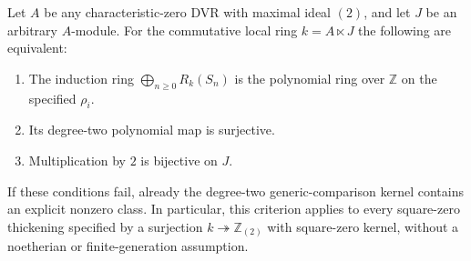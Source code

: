 \begin{theorem}
\label{C:squarezero_intrinsic_criterion}
Let $A$ be any characteristic-zero DVR with maximal ideal $(2)$,
and let $J$ be an arbitrary $A$-module. For the commutative local
ring $k=A\ltimes J$ the following are equivalent:
\begin{enumerate}
\item The induction ring $\bigoplus_{n\ge0}R_k(S_n)$ is the
polynomial ring over $\mathbb Z$ on the specified $\rho_i$.
\item Its degree-two polynomial map is surjective.
\item Multiplication by $2$ is bijective on $J$.
\end{enumerate}
If these conditions fail, already the degree-two generic-comparison
kernel contains an explicit nonzero class. In particular, this
criterion applies to every square-zero thickening specified by a
surjection $k\twoheadrightarrow\mathbb Z_{(2)}$ with square-zero
kernel, without a noetherian or finite-generation assumption.
\end{theorem}
